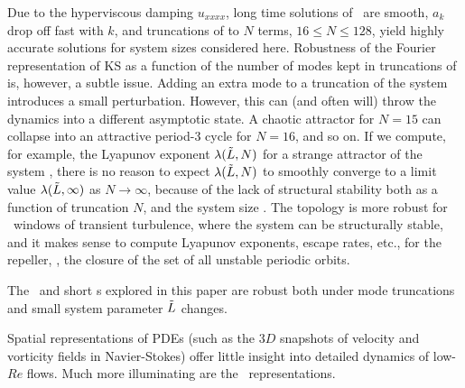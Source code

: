 Due to the hyperviscous damping $u_{xxxx}$, long time solutions of 
\KSe\ are smooth, $a_k$ drop off fast with $k$, 
and truncations of  to $N$ terms, $16 \leq N \leq 128$, 
yield highly accurate solutions for system sizes considered here.  
Robustness of the Fourier representation of KS as a function of the 
number of modes kept in truncations of  is, however, 
a subtle issue.  Adding an extra mode to a truncation of the system 
introduces a small perturbation. 
However, this can (and often will) throw the dynamics
into a different asymptotic state.  A chaotic attractor for $N=15$ can
collapse into an attractive period-3 cycle for $N=16$, and so on.  If
we compute, for example, the Lyapunov exponent $\lambda(\tilde{L},N)$ for
a strange attractor of the system , there is no reason to
expect $\lambda(\tilde{L},N)$ to smoothly converge to a limit value
$\lambda(\tilde{L},\infty)$ as $N \rightarrow \infty$, because of the lack
of structural stability both as a function of truncation $N$, and the
system size \tildeL.  
The topology is more robust for \tildeL\ windows
of transient turbulence, where the system can be structurally stable,
and it makes sense to compute Lyapunov exponents, escape rates, etc.,
for the {repeller}, \ie, the closure of the set of all {unstable}
periodic orbits.

The \eqva\ and short \po s explored in this paper
are robust both under mode truncations and small
system parameter $\tilde{L}$ changes.

Spatial representations of PDEs (such as the 3$D$
snapshots of velocity and vorticity fields in Navier-Stokes)
offer little insight into detailed dynamics of low-$Re$ flows.
Much more illuminating are the \statesp\ representations.

